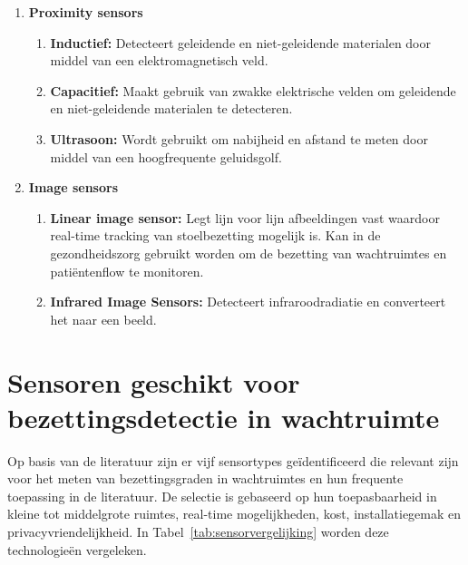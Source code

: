 \begin{enumerate}
    
    \item \textbf{Proximity sensors}
    \begin{enumerate}
        \item \textbf{Inductief:} Detecteert geleidende en niet-geleidende materialen door middel van een elektromagnetisch veld.
        \item \textbf{Capacitief:} Maakt gebruik van zwakke elektrische velden om geleidende en niet-geleidende materialen te detecteren.
        \item \textbf{Ultrasoon:} Wordt gebruikt om nabijheid en afstand te meten door middel van een hoogfrequente geluidsgolf.
    \end{enumerate}
    
    \item \textbf{Image sensors}
    \begin{enumerate}
        \item \textbf{Linear image sensor:} Legt lijn voor lijn afbeeldingen vast waardoor real-time tracking van stoelbezetting mogelijk is. Kan in de gezondheidszorg gebruikt worden om de bezetting van wachtruimtes en patiëntenflow te monitoren.
        \item \textbf{Infrared Image Sensors:} Detecteert infraroodradiatie en converteert het naar een beeld.
    \end{enumerate}
\end{enumerate}


\section{Sensoren geschikt voor bezettingsdetectie in wachtruimte}
Op basis van de literatuur zijn er vijf sensortypes geïdentificeerd die relevant zijn voor het meten van bezettingsgraden in wachtruimtes en hun frequente toepassing in de literatuur. De selectie is gebaseerd op hun toepasbaarheid in kleine tot middelgrote ruimtes, real-time mogelijkheden, kost, installatiegemak en privacyvriendelijkheid. In Tabel~\ref{tab:sensorvergelijking} worden deze technologieën vergeleken.

